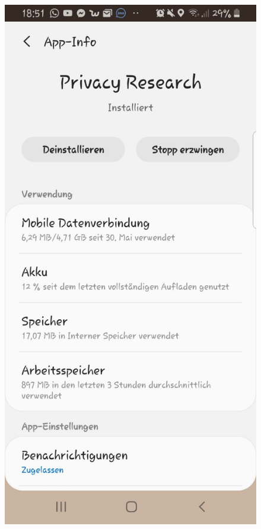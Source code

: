 \begin{figure}
	\centering
	\begin{minipage}{.45\textwidth}
		\begin{center}
		\includegraphics[width=\textwidth]{data/data-usage/data-usage4.jpeg}

\end{center}
\end{minipage}
\end{figure}
